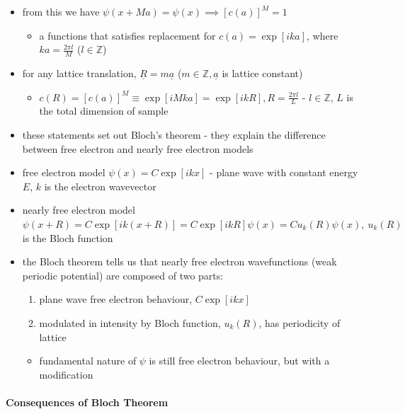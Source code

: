\documentclass[a4paper,11pt,normalem]{article}
\begin{document}
\begin{itemize}
    \item from this we have \(\psi(x+Ma) = \psi(x) \implies [c(a)]^M = 1\)
        \begin{itemize}
            \item a functions that satisfies replacement for \(c(a) = \exp[ika]\), where \(ka = \frac{2\pi l}{M}\) (\(l \in \mathbb{Z}\))
        \end{itemize}
    \item for any lattice translation, \(\underline{R} = m\underline{a}\) (\(m \in \mathbb{Z},\underline{a}\) is lattice constant)
        \begin{itemize}
            \item \(c(R) = [c(a)]^M \equiv \exp[iMka] = \exp[ikR], R = \frac{2\pi l}{L}\) - \(l \in \mathbb{Z}\), \(L\) is the total dimension of sample
        \end{itemize}
    \item these statements set out Bloch's theorem - they explain the difference between free electron and nearly free electron models
    \item free electron model \(\psi(x) = C\exp[ikx]\) - plane wave with constant energy \(E\), \(k\) is the electron wavevector
    \item nearly free electron model \(\psi(x+R) = C\exp[ik(x+R)] = C\exp[ikR]\psi(x) = Cu_k(R)\psi(x),~ u_k(R)\) is the Bloch function
    \item the Bloch theorem tells us that nearly free electron wavefunctions (weak periodic potential) are composed of two parts:
        \begin{enumerate}
            \item plane wave free electron behaviour, \(C\exp[ikx]\)
            \item modulated in intensity by Bloch function, \(u_k(R)\), has periodicity of lattice
        \end{enumerate}
        \begin{itemize}
            \item fundamental nature of \(\psi\) is still free electron behaviour, but with a modification
        \end{itemize}
\end{itemize}

\paragraph{Consequences of Bloch Theorem}
\end{document}
